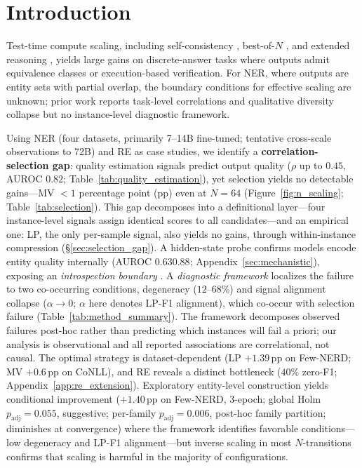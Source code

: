 \section{Introduction}\label{sec:introduction}

Test-time compute scaling, including self-consistency \cite{wang2023selfconsistency}, best-of-$N$ \cite{snell2025scaling, brown2024monkeys}, and extended reasoning \cite{muennighoff2025s1}, yields large gains on discrete-answer tasks where outputs admit equivalence classes or execution-based verification.
For NER, where outputs are entity sets with partial overlap, the boundary conditions for effective scaling are unknown; prior work reports task-level correlations \cite{yao2026consistency} and qualitative diversity collapse \cite{yun2025price} but no instance-level diagnostic framework.

Using NER (four datasets, primarily 7--14B fine-tuned; tentative cross-scale observations to 72B) and RE as case studies, we identify a \textbf{correlation-selection gap}: quality estimation signals predict output quality ($\rho$ up to $0.45$, AUROC $0.82$; Table~\ref{tab:quality_estimation}), yet selection yields no detectable gains---MV ${<}1$ percentage point (pp) even at $N{=}64$ (Figure~\ref{fig:n_scaling}; Table~\ref{tab:selection}).
This gap decomposes into a definitional layer---four instance-level signals assign identical scores to all candidates---and an empirical one: LP, the only per-sample signal, also yields no gains, through within-instance compression (\S\ref{sec:selection_gap}).
A hidden-state probe confirms models encode entity quality internally (AUROC $0.63$\textendash$0.88$; Appendix~\ref{sec:mechanistic}), exposing an \textit{introspection boundary} \cite{huang2024large}.
A \textit{diagnostic framework} localizes the failure to two co-occurring conditions, degeneracy ($12$--$68$\%) and signal alignment collapse ($\alpha{\to}0$; $\alpha$ here denotes LP-F1 alignment), which co-occur with selection failure (Table~\ref{tab:method_summary}).
The framework decomposes observed failures post-hoc rather than predicting which instances will fail a priori; our analysis is observational and all reported associations are correlational, not causal.
The optimal strategy is dataset-dependent (LP $+1.39$\,pp on Few-NERD; MV $+0.6$\,pp on CoNLL), and RE reveals a distinct bottleneck ($40$\% zero-F1; Appendix~\ref{app:re_extension}).
Exploratory entity-level construction yields conditional improvement ($+1.40$\,pp on Few-NERD, 3-epoch; global Holm $p_{\text{adj}}{=}0.055$, suggestive; per-family $p_{\text{adj}}{=}0.006$, post-hoc family partition; diminishes at convergence) where the framework identifies favorable conditions---low degeneracy and LP-F1 alignment---but inverse scaling in most $N$-transitions confirms that scaling is harmful in the majority of configurations.


